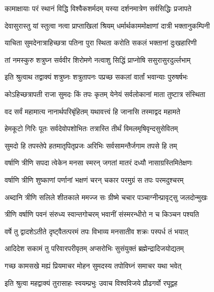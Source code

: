 \twolineshloka
{कामाक्षायाः परं स्थानं विद्धि विश्वैकशर्मदम्}
{यस्या दर्शनमात्रेण सर्वसिद्धिः प्रजापते}%

\twolineshloka
{देवासुरास्तु यां स्तुत्वा नत्वा प्राप्ताखिलां श्रियम्}
{धर्मार्थकाममोक्षाणां दात्री भक्तानुकम्पिनी}%

\twolineshloka
{याचिता सुमदेनात्राहिच्छत्रा पतिना पुरा}
{स्थिता करोति सकलं भक्तानां दुःखहारिणी}%

\twolineshloka
{तां नमस्कुरु शत्रुघ्न सर्ववीर शिरोमणे}
{नत्वाशु सिद्धिं प्राप्नोषि ससुरासुरदुर्ल्लभाम्}%

\twolineshloka
{इति श्रुत्वाथ तद्वाक्यं शत्रुघ्नः शत्रुतापनः}
{पप्रच्छ सकलां वार्तां भवान्याः पुरुषर्षभः}%


\twolineshloka
{कोऽहिच्छत्रापती राजा सुमदः किं तपः कृतम्}
{येनेयं सर्वलोकानां माता तुष्टात्र संस्थिता}%

\twolineshloka
{वद सर्वं महामात्य नानार्थपरिबृंहितम्}
{यथावत्त्वं हि जानासि तस्माद्वद महामते}%


\twolineshloka
{हेमकूटो गिरिः पूतः सर्वदेवोपशोभितः}
{तत्रास्ति तीर्थं विमलमृषिवृन्दसुसेवितम्}%

\twolineshloka
{सुमदो हि तपस्तेपे हतमातृपितृप्रजः}
{अरिभिः सर्वसामन्तैर्जगाम तपसे हि तम्}%

\twolineshloka
{वर्षाणि त्रीणि सपदा त्वेकेन मनसा स्मरन्}
{जगतां मातरं दध्यौ नासाग्रस्तिमितेक्षणः}%

\twolineshloka
{वर्षाणि त्रीणि शुष्काणां पर्णानां भक्षणं चरन्}
{चकार परमुग्रं स तपः परमदुश्चरम्}%

\twolineshloka
{अब्दानि त्रीणि सलिले शीतकाले ममज्ज सः}
{ग्रीष्मे चचार पञ्चाग्नीन्प्रावृट्सु जलदोन्मुखः}%

\twolineshloka
{त्रीणि वर्षाणि पवनं संरुध्य स्वान्तगोचरम्}
{भवानीं संस्मरन्धीरो न च किञ्चन पश्यति}%

\twolineshloka
{वर्षे तु द्वादशेऽतीते दृष्ट्वैतत्परमं तपः}
{विभाव्य मनसातीव शक्रः पस्पर्ध तं भयात्}%

\twolineshloka
{आदिदेश सकामं तु परिवारपरीवृतम्}
{अप्सरोभिः सुसंयुक्तं ब्रह्मेन्द्रादिजयोद्यतम्}%

\twolineshloka
{गच्छ कामसखे मह्यं प्रियमाचर मोहन}
{सुमदस्य तपोविघ्नं समाचर यथा भवेत्}%

\twolineshloka
{इति श्रुत्वा महद्वाक्यं तुरासाहः स्वयम्प्रभुः}
{उवाच विश्वविजये प्रौढगर्वो रघूद्वह}%


